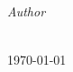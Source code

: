 %
%
%
%
%
%

\begin{titlepage}
	\centering
	\thispagestyle{empty}
	\vfill
	\HRule\\[0.4cm]
	\vspace{8mm}
	\huge{\textbf{{\selectfont
	\myMaintitle}}}\\
	\HRule\\[0.4cm]
	\vspace{9mm}

		\begin{center}
			\large
			\textit{Author}\\
			\textsc{\myName}\\ %
		\end{center}
	

	\vspace{5cm}
	\large{\today}
	\vfill
	\end{titlepage}
	\newpage
